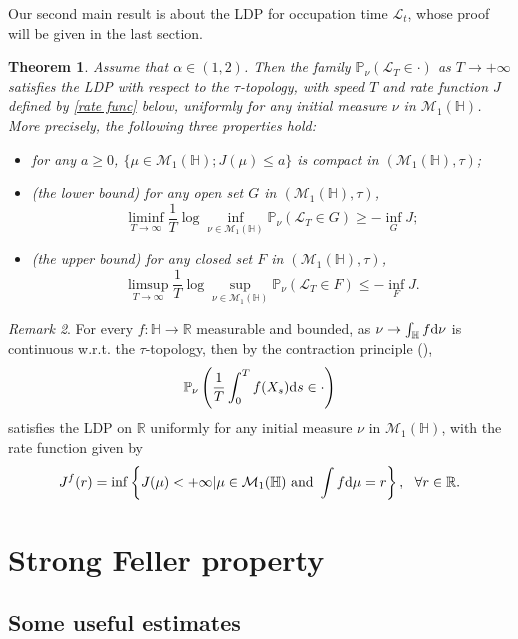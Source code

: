\documentclass[12pt,a4paper]{article}
\newtheorem{theorem}{Theorem}[section]
\theoremstyle{definition}
\theoremstyle{remark}
\newtheorem{rem}[theorem]{Remark}
\numberwithin{equation}{section}
\newcommand{\HH}{\mathbb{H}}
\newcommand{\R}{\mathbb{R}}
\newcommand{\PP}{\mathbb{P}}
\newcommand{\dif}{{\rm d}}
\begin{document}
{  Our second main result is about the LDP for occupation time $
\mathcal{L}_t$, whose proof will be given in the last section.
\begin{theorem}\label{thm main} Assume that $\alpha \in (1,2)$.
Then the family $\PP_{\nu}(\mathcal L_T\in \cdot)$ as $T\rightarrow +\infty$ satisfies the LDP with respect to the $\tau$-topology, with speed $T$ and rate function $J$ defined by \eqref{rate func} below, uniformly for any initial measure $\nu$ in $\mathcal M_1(\HH)$.  More precisely, the following three properties hold:
\begin{itemize}
  \item[(a1)]  for any $a\ge0$, $\{\mu\in \mathcal M_1(\HH); J(\mu)\le a \}$ is compact in  $(\mathcal M_1(\HH),\tau)$;
  \item[(a2)] (the lower bound) for any  open set $G$ in $(\mathcal M_1(\HH),\tau)$,
   $$
   \liminf_{T\rightarrow \infty}\frac1T\log\inf_{\nu\in\mathcal M_1(\HH)}\mathbb P_{\nu}(\mathcal L_T\in G)\ge -\inf_G J;
   $$
  \item[(a3)](the upper bound) for any  closed set $F$ in  $(\mathcal M_1(\HH),\tau)$,
   $$
   \limsup_{T\rightarrow \infty}\frac1T\log\sup_{\nu\in\mathcal M_1(\HH)}\mathbb P_{\nu}(\mathcal L_T\in F)\le -\inf_F J.
   $$
\end{itemize}
\end{theorem}

\begin{rem} For every $f:\HH\rightarrow \R$ measurable and bounded, as $\nu\rightarrow\int_{\HH}f\dif \nu$ is continuous w.r.t. the $\tau$-topology, then by the contraction principle (\cite[Theorem 4.2.1]{DZ}), $$\mathbb P_{\nu}\left(\frac{1}{T}\int_0^T f(X_s)\dif s\in \cdot\right)$$
satisfies the LDP on $\R$ uniformly for any initial measure $\nu$ in $\mathcal M_1(\HH)$,  with the rate function given by
$$
J^f(r)=\inf\left\{J(\mu)<+\infty|\mu\in\mathcal M_1(\HH)\  \text{and } \int f\dif\mu=r \right\},\ \ \forall r\in\R.
$$
\end{rem}






\section{Strong Feller property}





 \subsection{Some useful estimates}



}
\end{document}
